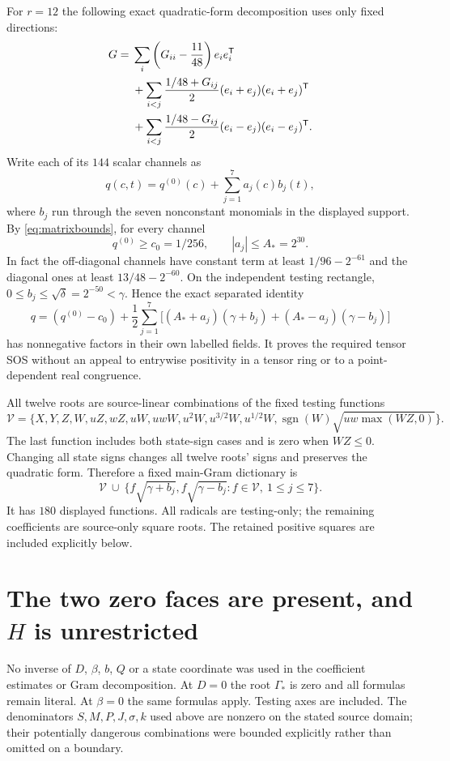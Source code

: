 \documentclass[11pt]{article}
\begin{document}
For $r=12$ the following exact quadratic-form decomposition uses
only fixed directions:
\[
\begin{split}
 G={}&\sum_i\left(G_{ii}-{11\over48}\right)e_ie_i^{\mathsf T}\\
 &+\sum_{i<j}{1/48+G_{ij}\over2}(e_i+e_j)(e_i+e_j)^{\mathsf T}\\
 &+\sum_{i<j}{1/48-G_{ij}\over2}(e_i-e_j)(e_i-e_j)^{\mathsf T}.
\end{split}
\]
Write each of its $144$ scalar channels as
\[
 q(c,t)=q^{(0)}(c)+\sum_{j=1}^{7}a_j(c)b_j(t),
\]
where $b_j$ run through the seven nonconstant monomials
in the displayed support. By \eqref{eq:matrixbounds}, for every
channel
\[
 q^{(0)}\ge c_0=1/256,\qquad |a_j|\le A_*=2^{30}.
\]
In fact the off-diagonal channels have constant term at least
$1/96-2^{-61}$ and the diagonal ones at least $13/48-2^{-60}$.
On the independent testing rectangle,
$0\le b_j\le\sqrt\delta=2^{-50}<\gamma$.
Hence the exact separated identity
\[
 q=(q^{(0)}-c_0)+\frac12\sum_{j=1}^{7}
 \bigl[(A_*+a_j)(\gamma+b_j)+(A_*-a_j)(\gamma-b_j)\bigr]
\]
has nonnegative factors in their own labelled fields. It proves
the required tensor SOS without an appeal to entrywise positivity
in a tensor ring or to a point-dependent real congruence.

All twelve roots are source-linear combinations of the fixed
testing functions
\[
 \mathcal V=\{X,Y,Z,W,uZ,wZ,uW,uwW,u^2W,
                u^{3/2}W,u^{1/2}W,
                  \operatorname{sgn}(W)\sqrt{uw\max(WZ,0)}\}.
\]
The last function includes both state-sign cases and is zero
when $WZ\le0$. Changing all state signs changes all twelve roots'
signs and preserves the quadratic form.
Therefore a fixed main-Gram dictionary is
\[
 \mathcal V\ \cup\ \{f\sqrt{\gamma+b_j},f\sqrt{\gamma-b_j}:
                         f\in\mathcal V,\ 1\le j\le7\}.
\]
It has $180$ displayed functions. All radicals are testing-only;
the remaining coefficients are source-only square roots. The retained
positive squares are included explicitly below.

\section{The two zero faces are present, and $H$ is unrestricted}

No inverse of $D$, $\beta$, $b$, $Q$ or a state coordinate was used
in the coefficient estimates or Gram decomposition. At $D=0$
the root $\Gamma_*$ is zero and all formulas remain literal.
At $\beta=0$ the same formulas apply. Testing axes are included.
The denominators $S,M,P,J,\sigma,k$ used above are nonzero on
the stated source domain; their potentially dangerous combinations
were bounded explicitly rather than omitted on a boundary.
\end{document}
